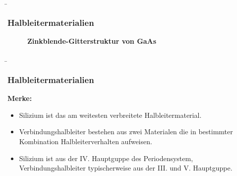 \begin{frame}
    \b{
    \frametitle{Halbleitermaterialien}
    \begin{figure}[H]
        \centering
        \begin{minipage}[c]{0.48\textwidth}
            \centering
            
        \end{minipage}
        \begin{minipage}[c]{0.48\textwidth}
            \centering
            
        \end{minipage}
        \caption{\textbf{Zinkblende-Gitterstruktur von GaAs}}  
    \end{figure}
    }

\end{frame}

\begin{frame}
    \b{
    \frametitle{Halbleitermaterialien}
    \textbf{Merke:}
    \begin{itemize}
        \item Silizium ist das am weitesten verbreitete Halbleitermaterial.
        \item Verbindungshalbleiter bestehen aus zwei Materialen die in bestimmter Kombination Halbleiterverhalten aufweisen.
        \item Silizium ist aus der IV. Hauptguppe des Periodensystem, Verbindungshalbleiter typischerweise aus der III. und V. Hauptguppe.
    \end{itemize}}
\end{frame}

